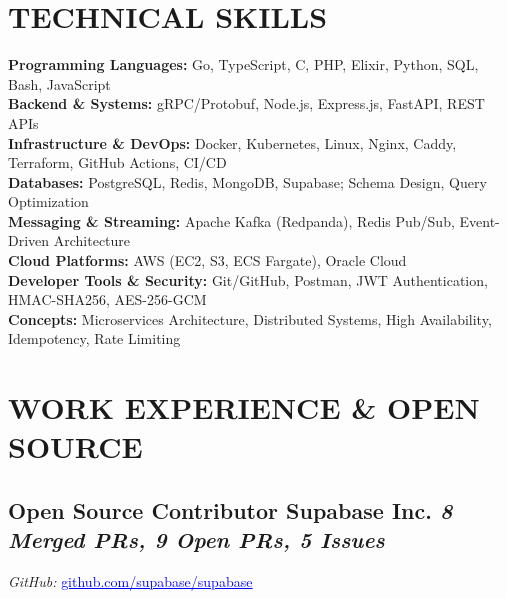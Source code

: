\documentclass[letterpaper,10pt]{article}
\begin{document}
\section{TECHNICAL SKILLS}

\vspace{2pt}
\noindent
\textbf{Programming Languages:} Go, TypeScript, C, PHP, Elixir, Python, SQL, Bash, JavaScript \\[3pt]
\textbf{Backend \& Systems:} gRPC/Protobuf, Node.js, Express.js, FastAPI, REST APIs \\[3pt]
\textbf{Infrastructure \& DevOps:} Docker, Kubernetes, Linux, Nginx, Caddy, Terraform, GitHub Actions, CI/CD \\[3pt]
\textbf{Databases:} PostgreSQL, Redis, MongoDB, Supabase; Schema Design, Query Optimization \\[3pt]
\textbf{Messaging \& Streaming:} Apache Kafka (Redpanda), Redis Pub/Sub, Event-Driven Architecture \\[3pt]
\textbf{Cloud Platforms:} AWS (EC2, S3, ECS Fargate), Oracle Cloud \\[3pt]
\textbf{Developer Tools \& Security:} Git/GitHub, Postman, JWT Authentication, HMAC-SHA256, AES-256-GCM \\[3pt]
\textbf{Concepts:} Microservices Architecture, Distributed Systems, High Availability, Idempotency, Rate Limiting


\section{WORK EXPERIENCE \& OPEN SOURCE}

\subsection{Open Source Contributor \textbar{} Supabase Inc. \hfill \normalfont\textit{8 Merged PRs, 9 Open PRs, 5 Issues}}

\noindent
\textit{GitHub:} \href{https://github.com/supabase/supabase/pulls?q=author\%3Amandar1045}{\textcolor{blue}{\underline{github.com/supabase/supabase}}}
\end{document}
